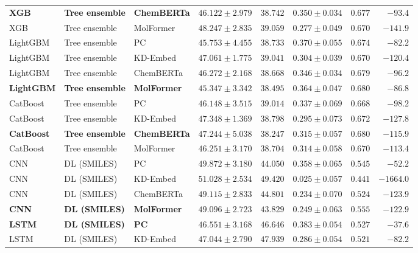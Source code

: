 \documentclass{article}
\begin{document}
\begin{table}[!ht]
{\begin{tabular}{lllccccr}
\textbf{XGB} & \textbf{Tree ensemble} & \textbf{ChemBERTa} & $\mathbf{46.122 \pm 2.979}$ & $\mathbf{38.742}$ & $\mathbf{0.350 \pm 0.034}$ & $\mathbf{0.677}$ & $\mathbf{-93.4}$ \\
XGB & Tree ensemble & MolFormer & $48.247 \pm 2.835$ & $39.059$ & $0.277 \pm 0.049$ & $0.670$ & $-141.9$ \\
LightGBM & Tree ensemble & PC & $45.753 \pm 4.455$ & $38.733$ & $0.370 \pm 0.055$ & $0.674$ & $-82.2$ \\
LightGBM & Tree ensemble & KD-Embed & $47.061 \pm 1.775$ & $39.041$ & $0.304 \pm 0.039$ & $0.670$ & $-120.4$ \\
LightGBM & Tree ensemble & ChemBERTa & $46.272 \pm 2.168$ & $38.668$ & $0.346 \pm 0.034$ & $0.679$ & $-96.2$ \\
\textbf{LightGBM} & \textbf{Tree ensemble} & \textbf{MolFormer} & $\mathbf{45.347 \pm 3.342}$ & $\mathbf{38.495}$ & $\mathbf{0.364 \pm 0.047}$ & $\mathbf{0.680}$ & $\mathbf{-86.8}$ \\
CatBoost & Tree ensemble & PC & $46.148 \pm 3.515$ & $39.014$ & $0.337 \pm 0.069$ & $0.668$ & $-98.2$ \\
CatBoost & Tree ensemble & KD-Embed & $47.348 \pm 1.369$ & $38.798$ & $0.295 \pm 0.073$ & $0.672$ & $-127.8$ \\
\textbf{CatBoost} & \textbf{Tree ensemble} & \textbf{ChemBERTa} & $\mathbf{47.244 \pm 5.038}$ & $\mathbf{38.247}$ & $\mathbf{0.315 \pm 0.057}$ & $\mathbf{0.680}$ & $\mathbf{-115.9}$ \\
CatBoost & Tree ensemble & MolFormer & $46.251 \pm 3.170$ & $38.704$ & $0.314 \pm 0.058$ & $0.670$ & $-113.4$ \\
\midrule
CNN & DL (SMILES) & PC & $49.872 \pm 3.180$ & $44.050$ & $0.358 \pm 0.065$ & $0.545$ & $-52.2$ \\
CNN & DL (SMILES) & KD-Embed & $51.028 \pm 2.534$ & $49.420$ & $0.025 \pm 0.057$ & $0.441$ & $-1664.0$ \\
CNN & DL (SMILES) & ChemBERTa & $49.115 \pm 2.833$ & $44.801$ & $0.234 \pm 0.070$ & $0.524$ & $-123.9$ \\
\textbf{CNN} & \textbf{DL (SMILES)} & \textbf{MolFormer} & $\mathbf{49.096 \pm 2.723}$ & $\mathbf{43.829}$ & $\mathbf{0.249 \pm 0.063}$ & $\mathbf{0.555}$ & $\mathbf{-122.9}$ \\
\textbf{LSTM} & \textbf{DL (SMILES)} & \textbf{PC} & $\mathbf{46.551 \pm 3.168}$ & $\mathbf{46.646}$ & $\mathbf{0.383 \pm 0.054}$ & $\mathbf{0.527}$ & $\mathbf{-37.6}$ \\
LSTM & DL (SMILES) & KD-Embed & $47.044 \pm 2.790$ & $47.939$ & $0.286 \pm 0.054$ & $0.521$ & $-82.2$ \\

\end{tabular}}
\end{table}
\end{document}
